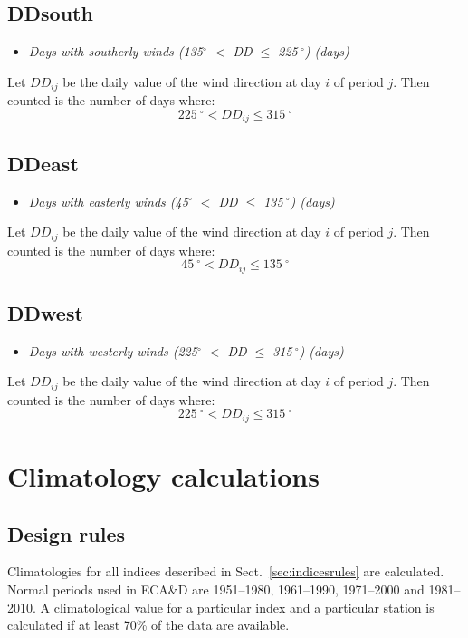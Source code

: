 \documentclass[a4paper,11pt]{article}
\begin{document}
\subsection*{DDsouth}
\begin{itemize}
\item \textit{Days with southerly winds (135$^{\circ}$ $<$ DD $\le$ 225$\:^\circ$) (days)}
\end{itemize}
Let $DD_{ij}$ be the daily value of the wind direction at day $i$ of period
$j$. Then counted is the number of days where:
\begin{equation*}
225\:^\circ < DD_{ij} \le 315\:^\circ
\end{equation*}

\subsection*{DDeast}
\begin{itemize}
\item \textit{Days with easterly winds (45$^{\circ}$ $<$ DD $\le$ 135$\:^\circ$) (days)}
\end{itemize}
Let $DD_{ij}$ be the daily value of the wind direction at day $i$ of period
$j$. Then counted is the number of days where:
\begin{equation*}
45\:^\circ < DD_{ij} \le 135\:^\circ
\end{equation*}

\subsection*{DDwest}
\begin{itemize}
\item \textit{Days with westerly winds (225$^{\circ}$ $<$ DD $\le$ 315$\:^\circ$) (days)}
\end{itemize}
Let $DD_{ij}$ be the daily value of the wind direction at day $i$ of period
$j$. Then counted is the number of days where:
\begin{equation*}
225\:^\circ < DD_{ij} \le 315\:^\circ
\end{equation*}





\section{Climatology calculations}
\label{sec:climatology}
\subsection{Design rules}
\label{sec:climatologyrules}
Climatologies for all indices described in Sect.~\ref{sec:indicesrules}
are calculated. Normal periods used in ECA\&D are 1951--1980, 1961--1990, 1971--2000
and 1981--2010.
A climatological value for a particular index and a particular station is
calculated if at least 70\% of the data are available.
\end{document}

